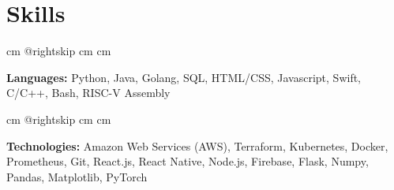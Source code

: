 \documentclass[10pt, a4paper]{article}
\begin{document}
    \section{Skills}
    
            \begingroup\raggedright    {} cm
            \advance\csname @rightskip cm
            \advance{} cm

            \textbf{Languages:} Python, Java, Golang, SQL, HTML/CSS, Javascript, Swift, C/C++, Bash, RISC-V Assembly

            \par\endgroup

        \vspace{0.12 cm}
            \begingroup\raggedright    {} cm
            \advance\csname @rightskip cm
            \advance{} cm

            \textbf{Technologies:} Amazon Web Services (AWS), Terraform, Kubernetes, Docker, Prometheus, Git, React.js, React Native, Node.js, Firebase, Flask, Numpy, Pandas, Matplotlib, PyTorch

            \par\endgroup
\end{document}
